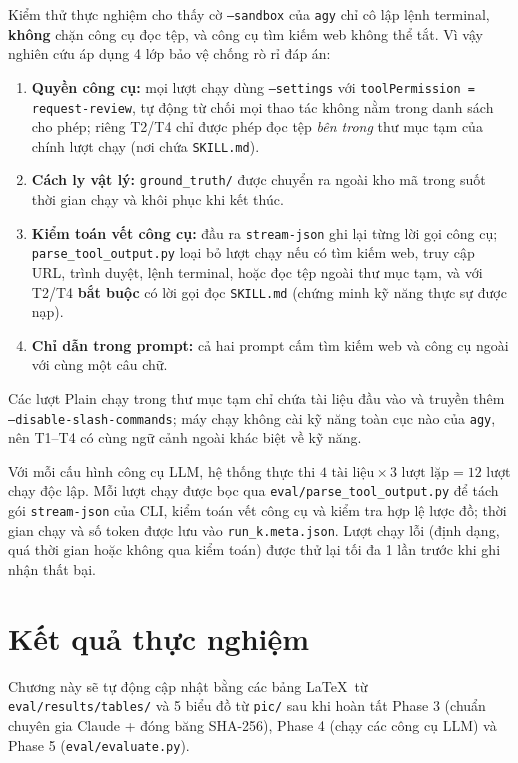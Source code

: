 \documentclass[12pt,a4paper]{report}
\begin{document}
Kiểm thử thực nghiệm cho thấy cờ \texttt{--sandbox} của \texttt{agy} chỉ cô lập lệnh terminal, \textbf{không} chặn công cụ đọc tệp, và công cụ tìm kiếm web không thể tắt. Vì vậy nghiên cứu áp dụng 4 lớp bảo vệ chống rò rỉ đáp án:
\begin{enumerate}
  \item \textbf{Quyền công cụ:} mọi lượt chạy dùng \texttt{--settings} với \texttt{toolPermission = request-review}, tự động từ chối mọi thao tác không nằm trong danh sách cho phép; riêng T2/T4 chỉ được phép đọc tệp \textit{bên trong} thư mục tạm của chính lượt chạy (nơi chứa \texttt{SKILL.md}).
  \item \textbf{Cách ly vật lý:} \texttt{ground\_truth/} được chuyển ra ngoài kho mã trong suốt thời gian chạy và khôi phục khi kết thúc.
  \item \textbf{Kiểm toán vết công cụ:} đầu ra \texttt{stream-json} ghi lại từng lời gọi công cụ; \texttt{parse\_tool\_output.py} loại bỏ lượt chạy nếu có tìm kiếm web, truy cập URL, trình duyệt, lệnh terminal, hoặc đọc tệp ngoài thư mục tạm, và với T2/T4 \textbf{bắt buộc} có lời gọi đọc \texttt{SKILL.md} (chứng minh kỹ năng thực sự được nạp).
  \item \textbf{Chỉ dẫn trong prompt:} cả hai prompt cấm tìm kiếm web và công cụ ngoài với cùng một câu chữ.
\end{enumerate}
Các lượt Plain chạy trong thư mục tạm chỉ chứa tài liệu đầu vào và truyền thêm \texttt{--disable-slash-commands}; máy chạy không cài kỹ năng toàn cục nào của \texttt{agy}, nên T1--T4 có cùng ngữ cảnh ngoài khác biệt về kỹ năng.

Với mỗi cấu hình công cụ LLM, hệ thống thực thi $4 \text{ tài liệu} \times 3 \text{ lượt lặp} = 12$ lượt chạy độc lập. Mỗi lượt chạy được bọc qua \texttt{eval/parse\_tool\_output.py} để tách gói \texttt{stream-json} của CLI, kiểm toán vết công cụ và kiểm tra hợp lệ lược đồ; thời gian chạy và số token được lưu vào \texttt{run\_k.meta.json}. Lượt chạy lỗi (định dạng, quá thời gian hoặc không qua kiểm toán) được thử lại tối đa 1 lần trước khi ghi nhận thất bại.

\chapter{Kết quả thực nghiệm}

\begin{notebox}
Chương này sẽ tự động cập nhật bằng các bảng \LaTeX\ từ \texttt{eval/results/tables/} và 5 biểu đồ từ \texttt{pic/} sau khi hoàn tất Phase 3 (chuẩn chuyên gia Claude + đóng băng SHA-256), Phase 4 (chạy các công cụ LLM) và Phase 5 (\texttt{eval/evaluate.py}).
\end{notebox}
\end{document}
